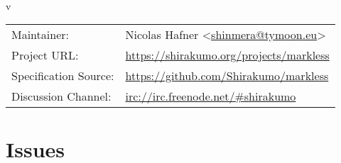 \documentclass[12pt,a4paper,titlepage]{article}
\title{\doctitle}
\author{\docauthor}
\date{\d_mny\today}
\begin{document}
\begin{titlepage}
  \begin{center}
    \vspace*{5cm}
    {\bfseries\fontsize{32pt}{30pt}\selectfont\doctitle} \\
    \vspace{0.5cm}
    {\large v\gittag}
    \vfill
    \begin{tabular}{ll}
      Maintainer: & Nicolas Hafner <\href{mailto:shinmera@tymoon.eu}{shinmera@tymoon.eu}> \\
      Project URL: & \url{https://shirakumo.org/projects/markless} \\
      Specification Source: & \url{https://github.com/Shirakumo/markless} \\
      Discussion Channel: & \url{irc://irc.freenode.net/#shirakumo} \\
    \end{tabular}
  \end{center}
\end{titlepage}
\tableofcontents








\newpage\section*{Issues}\label{section:ISSUES}

\glsaddall
\newpage\label{section:GLOSSARY}\printglossaries
\end{document}
